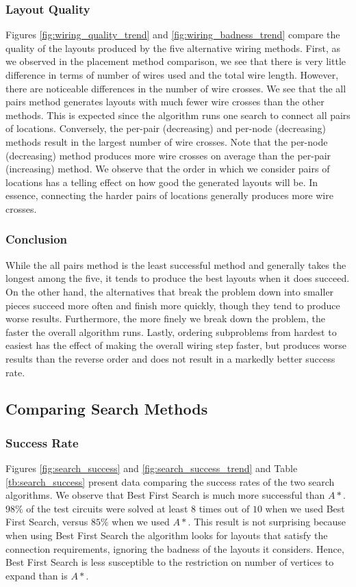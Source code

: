 \subsubsection{Layout Quality}
Figures \ref{fig:wiring_quality_trend} and
\ref{fig:wiring_badness_trend} compare the
quality of the layouts produced by the five alternative wiring methods. First,
as we observed in the placement method comparison, we see that there is very
little difference in terms of number of wires used and the total wire length.
However, there are noticeable differences in the number of wire crosses. We see
that the all pairs method generates layouts with much fewer wire crosses than
the other methods. This is expected since the algorithm runs one search to
connect all pairs of locations. Conversely, the per-pair (decreasing) and
per-node (decreasing) methods
result in the largest number of wire crosses. Note that
the per-node (decreasing) method produces more wire crosses on average than the
per-pair (increasing) method.
We observe that the order in which we consider pairs of
locations has a telling effect on how good the generated layouts will be.
In essence,
connecting the harder pairs of locations generally produces more wire crosses.

\subsubsection{Conclusion}
While the all pairs method is the least successful
method and generally takes the longest among the five,
it tends to produce the best layouts when it does succeed. On the other hand,
the alternatives that break the problem down into smaller pieces succeed more
often and finish more quickly, though they tend to produce worse results.
Furthermore,
the more finely we break down the problem, the faster the overall algorithm runs.
Lastly, ordering subproblems from hardest to easiest has the effect of making the
overall wiring step faster, but produces worse results than the reverse
order and does not result in a markedly better success rate.

\subsection{Comparing Search Methods}

\subsubsection{Success Rate}
Figures \ref{fig:search_success} and
\ref{fig:search_success_trend} and Table \ref{tb:search_success} present
data comparing the success rates of the two search algorithms.
We observe that Best First Search is much more
successful than $A*$. $98\%$ of the test circuits were solved at least $8$ times
out of $10$ when we used Best First Search, versus $85\%$ when we used $A*$.
This result is not surprising because when using Best First Search the algorithm
looks for layouts that satisfy the connection requirements, ignoring the badness
of the layouts it considers. Hence, Best First Search is less susceptible to the
restriction on number of vertices to expand than is $A*$.

